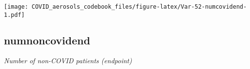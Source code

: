 \documentclass[]{article}
\begin{document}
\begin{minipage}{0.25 \textwidth}

\texttt{[image: COVID\_aerosols\_codebook\_files/figure-latex/Var-52-numcovidend-1.pdf]}

\end{minipage}

\noindent\makebox[\linewidth]{\rule{\textwidth}{0.4pt}}

\hypertarget{numnoncovidend}{%
\subsection{numnoncovidend}\label{numnoncovidend}}

\emph{Number of non-COVID patients (endpoint)}

\begin{minipage}{0.75 \textwidth}


\end{minipage}
\end{document}
